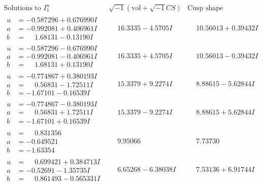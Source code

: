 \documentclass[1p]{elsarticle_modified}
\theoremstyle{definition}
\newcommand{\I}{\sqrt{-1}}
\begin{document}
$$\begin{array}{c|c|c}  
\text{Solutions to }I^u_{1}& \I (\text{vol} + \sqrt{-1}CS) & \text{Cusp shape}\\
 \hline 
\begin{aligned}
u &= -0.587296 + 0.676990 I \\
a &= -0.992081 + 0.406961 I \\
b &= \phantom{-}1.68131 - 0.13190 I\end{aligned}
 & \phantom{-}16.3335 - 4.5705 I & \phantom{-}10.56013 + 0.39432 I \\ \hline\begin{aligned}
u &= -0.587296 - 0.676990 I \\
a &= -0.992081 - 0.406961 I \\
b &= \phantom{-}1.68131 + 0.13190 I\end{aligned}
 & \phantom{-}16.3335 + 4.5705 I & \phantom{-}10.56013 - 0.39432 I \\ \hline\begin{aligned}
u &= -0.774867 + 0.380193 I \\
a &= \phantom{-}0.56831 - 1.72511 I \\
b &= -1.67101 - 0.16539 I\end{aligned}
 & \phantom{-}15.3379 + 9.2274 I & \phantom{-}8.88615 - 5.62844 I \\ \hline\begin{aligned}
u &= -0.774867 - 0.380193 I \\
a &= \phantom{-}0.56831 + 1.72511 I \\
b &= -1.67101 + 0.16539 I\end{aligned}
 & \phantom{-}15.3379 - 9.2274 I & \phantom{-}8.88615 + 5.62844 I \\ \hline\begin{aligned}
u &= \phantom{-}0.831356\phantom{ +0.000000I} \\
a &= -0.649521\phantom{ +0.000000I} \\
b &= -1.63354\phantom{ +0.000000I}\end{aligned}
 & \phantom{-}9.95066\phantom{ +0.000000I} & \phantom{-}7.73730\phantom{ +0.000000I} \\ \hline\begin{aligned}
u &= \phantom{-}0.699421 + 0.384713 I \\
a &= -0.52691 - 1.35735 I \\
b &= \phantom{-}0.861493 - 0.565331 I\end{aligned}
 & \phantom{-}6.65268 - 6.38038 I & \phantom{-}7.53136 + 6.91744 I \\ \hline\begin{aligned}

\end{aligned}
\end{array}$$
\end{document}
